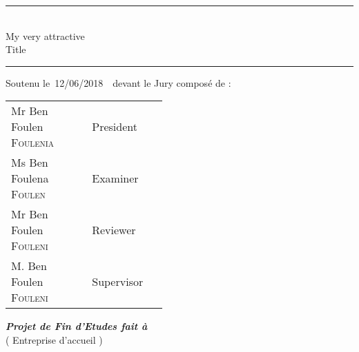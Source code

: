 \documentclass[a4paper, oneside, 12pt, final]{extreport}
\newcommand{\reportSubject} {%
  My very attractive \\ Title%
}
\newcommand{\dateSoutenance} {%
  12/06/2018%
}
\newcommand{\studyDepartment} {%
  Entreprise d'accueil %
}
\newcommand{\juryPresident} {%
  Mr Ben Foulen \textsc{Foulenia}%
}
\newcommand{\juryPresidentDesc} {%
  President%
}
\newcommand{\juryMemberOne} {%
  Ms Ben Foulena \textsc{Foulen}%
}
\newcommand{\juryMemberOneDesc} {%
  Examiner %
}
\newcommand{\juryMemberTwo} {%
  Mr Ben Foulen \textsc{Fouleni}%
}
\newcommand{\juryMemberTwoDesc} {%
  Reviewer%
}
\newcommand{\juryMemberThree} {%
	M. Ben Foulen \textsc{Fouleni}%
}
\newcommand{\juryMemberThreeDesc} {%
	Supervisor%
}
\newcommand{\juryMemberFour} {%
	M. Ben Foulen \textsc{Fouleni}%
}
\newcommand{\juryMemberFourDesc} {%
	Mentor%
}
\begin{document}
\begin{titlepage}
\begin{center}
\vspace{5pt} {%
  \renewcommand*{\familydefault}{\defaultFont}
  \fontsize{27pt}{27pt}\selectfont%
  \rule{0.5\textwidth}{.4pt}\\
  \vspace{10pt}
  \reportSubject{}\\%
  \vspace{10pt}
  \rule{0.5\textwidth}{.4pt}
}

\vspace{5pt}
Soutenu le\, \dateSoutenance\,\, devant le Jury compos\'e de :\\
\vspace{10pt}
\begin{tabular}{p{0.3\linewidth} p{0.15\linewidth}}
  \juryPresident{} & \juryPresidentDesc{}\\
  \juryMemberOne{} & \juryMemberOneDesc{}\\
  \juryMemberTwo{} & \juryMemberTwoDesc{}\\
  \juryMemberThree{} & \juryMemberThreeDesc{}\\
\end{tabular}


\vspace{10pt}%
\textbf{\textit{Projet de Fin d'Etudes fait \`a}}\\
\vspace{5pt}
(\studyDepartment)\\
\end{center}
\end{titlepage}

%
\end{document}
